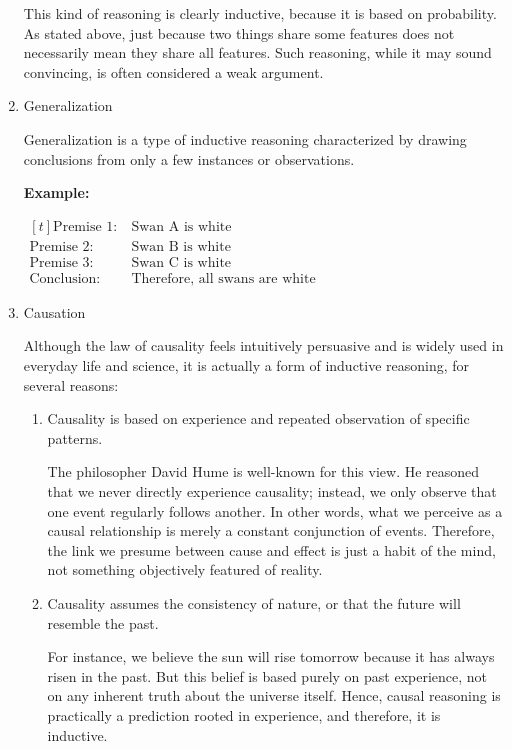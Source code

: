 \documentclass[12pt,a4paper,openany]{article}
\begin{document}
\begin{enumerate}
This kind of reasoning is clearly inductive, because it is based on
probability. As stated above, just because two things share some
features does not necessarily mean they share all features. Such
reasoning, while it may sound convincing, is often considered a weak
argument.

\item Generalization

Generalization is a type of inductive reasoning characterized by
drawing conclusions from only a few instances or observations.

\textbf{Example:}

\noindent
\(
\begin{aligned}[t]
 \text{Premise 1:} \ & \text{Swan A is white} \\
 \text{Premise 2:} \ & \text{Swan B is white} \\
 \text{Premise 3:} \ & \text{Swan C is white} \\
 \text{Conclusion:} \ & \text{Therefore, all swans are white}
\end{aligned}
\)

\item Causation

Although the law of causality feels intuitively persuasive and is
widely used in everyday life and science, it is actually a form of
inductive reasoning, for several reasons:

\begin{enumerate}
\item Causality is based on experience and repeated observation of
specific patterns.

The philosopher David Hume is well-known for this view. He reasoned
that we never directly experience causality; instead, we only
observe that one event regularly follows another. In other words,
what we perceive as a causal relationship is merely a constant
conjunction of events. Therefore, the link we presume between cause
and effect is just a habit of the mind, not something objectively
featured of reality.

\item Causality assumes the consistency of nature, or that the future will
resemble the past.

For instance, we believe the sun will rise tomorrow because it has
always risen in the past. But this belief is based purely on past
experience, not on any inherent truth about the universe itself.
Hence, causal reasoning is practically a prediction rooted in
experience, and therefore, it is inductive.
\end{enumerate}
\end{enumerate}
\end{document}
